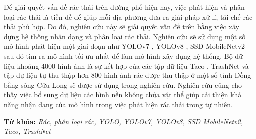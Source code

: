 \documentclass[./thesis.tex]{subfiles}
\begin{document}

{\fontsize{13}{12} \selectfont
Để giải quyết vấn đề rác thải trên đường phố hiện nay, việc phát hiện và phân loại rác thải là tiền đề để giúp mỗi địa phương đưa ra giải pháp xử lí, tái chế rác thải phù hợp.
Do đó, nghiên cứu này sẽ giải quyết vấn đề trên bằng việc xây dựng hệ thống nhận dạng và phân loại rác thải. Nghiên cứu sẽ sử dụng một số mô hình phát hiện một giai đoạn
như YOLOv7 \cite{wang2022yolov7}, YOLOv8 \cite{YOLOv8}, SSD MobileNetv2 \cite{Liu_2016} \cite{sandler2019mobilenetv2} sau đó tìm ra mô hình tối ưu nhất để làm mô hình xây dụng hệ thống.
Bộ dữ liệu khoảng 4000 hình ảnh là sự kết hợp của các tập dữ liệu Taco \cite{proença2020taco}, TrashNet \cite{yang2016classification} và tập dự liệu tự thu thập hơn 800 hình ảnh rác được thu thập ở một số tỉnh Đồng bằng sông Cửu Long sẽ được sử dụng trong nghiên cứu.
Nghiên cứu cũng cho thấy việc bổ sung dữ liệu các hình nền không chứa vật thể giúp cải thiện khả năng nhận dạng của mô hình trong việc phát hiện rác thải trong tự nhiên.

}
\bigskip



{\bf Từ khóa:} \textit{Rác, phân loại rác, YOLO, YOLOv7, YOLOv8, SSD MobileNetv2, Taco, TrashNet}
\end{document}
